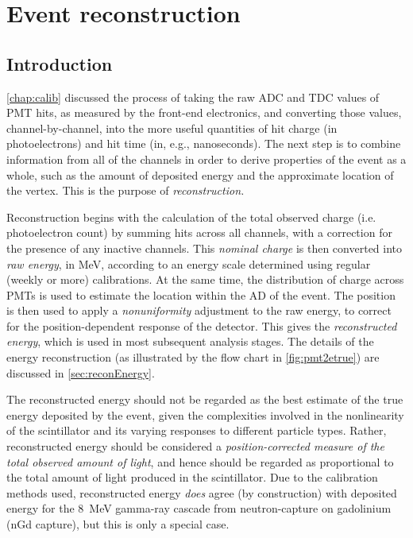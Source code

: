 \documentclass[../thesis.tex]{subfiles}
\begin{document}
\chapter{Event reconstruction}
\label{chap:recon}

\section{Introduction}
\label{sec:reconIntro}

\autoref{chap:calib} discussed the process of taking the raw ADC and TDC values of PMT hits, as measured by the front-end electronics, and converting those values, channel-by-channel, into the more useful quantities of hit charge (in photoelectrons) and hit time (in, e.g., nanoseconds). The next step is to combine information from all of the channels in order to derive properties of the event as a whole, such as the amount of deposited energy and the approximate location of the vertex. This is the purpose of \emph{reconstruction.}

Reconstruction begins with the calculation of the total observed charge (i.e. photoelectron count) by summing hits across all channels, with a correction for the presence of any inactive channels. This \emph{nominal charge} is then converted into \emph{raw energy}, in MeV, according to an energy scale determined using regular (weekly or more) calibrations. At the same time, the distribution of charge across PMTs is used to estimate the location within the AD of the event. The position is then used to apply a \emph{nonuniformity} adjustment to the raw energy, to correct for the position-dependent response of the detector. This gives the \emph{reconstructed energy}, which is used in most subsequent analysis stages. The details of the energy reconstruction (as illustrated by the flow chart in \autoref{fig:pmt2etrue}) are discussed in \autoref{sec:reconEnergy}.

The reconstructed energy should not be regarded as the best estimate of the true energy deposited by the event, given the complexities involved in the nonlinearity of the scintillator and its varying responses to different particle types. Rather, reconstructed energy should be considered a \emph{position-corrected measure of the total observed amount of light}, and hence should be regarded as proportional to the total amount of light produced in the scintillator. Due to the calibration methods used, reconstructed energy \emph{does} agree (by construction) with deposited energy for the 8~MeV gamma-ray cascade from neutron-capture on gadolinium (nGd capture), but this is only a special case.
\end{document}
